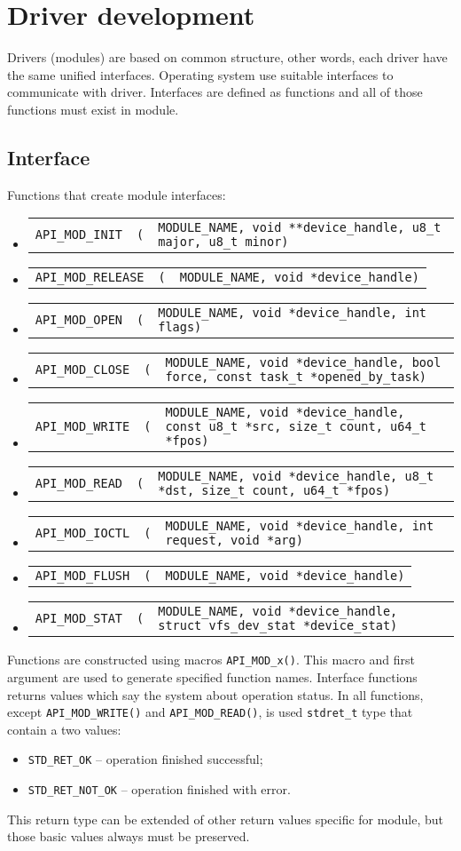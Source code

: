 \documentclass[a4paper,11pt]{report}
\makeatletter
\newcommand{\code}[1]{\texttt{#1}}
\newcommand{\type}[1]{\texttt{#1}}
\newcommand{\prototype}[2]{
   \begin{tabularx}{\textwidth}{@{}l@{}l@{}X}
      \code{#1} & \code{(} & \code{#2)}
   \end{tabularx}
}
\makeatother
\begin{document}
\chapter{Driver development}\label{sec:drv_devel}
Drivers (modules) are based on common structure, other words, each driver have the same
unified interfaces. Operating system use suitable interfaces to communicate with driver.
Interfaces are defined as functions and all of those functions must exist in module.

\section{Interface}
Functions that create module interfaces:
\begin{itemize}
   \item\prototype{API\_MOD\_INIT}{MODULE\_NAME, void **device\_handle, u8\_t major, u8\_t minor}
   \item\prototype{API\_MOD\_RELEASE}{MODULE\_NAME, void *device\_handle}
   \item\prototype{API\_MOD\_OPEN}{MODULE\_NAME, void *device\_handle, int flags}
   \item\prototype{API\_MOD\_CLOSE}{MODULE\_NAME, void *device\_handle, bool force, const task\_t *opened\_by\_task}
   \item\prototype{API\_MOD\_WRITE}{MODULE\_NAME, void *device\_handle, const u8\_t *src, size\_t count, u64\_t *fpos}
   \item\prototype{API\_MOD\_READ}{MODULE\_NAME, void *device\_handle, u8\_t *dst, size\_t count, u64\_t *fpos}
   \item\prototype{API\_MOD\_IOCTL}{MODULE\_NAME, void *device\_handle, int request, void *arg}
   \item\prototype{API\_MOD\_FLUSH}{MODULE\_NAME, void *device\_handle}
   \item\prototype{API\_MOD\_STAT}{MODULE\_NAME, void *device\_handle, struct vfs\_dev\_stat *device\_stat}
\end{itemize}

Functions are constructed using macros \code{API\_MOD\_x()}. This macro and first argument are used to
generate specified function names. Interface functions returns values which say the system about
operation status. In all functions, except \code{API\_MOD\_WRITE()} and \code{API\_MOD\_READ()}, is
used \type{stdret\_t} type that contain a two values:
\begin{itemize}
   \item \code{STD\_RET\_OK} -- operation finished successful;
   \item \code{STD\_RET\_NOT\_OK} -- operation finished with error.
\end{itemize}
This return type can be extended of other return values specific for module, but those basic values
always must be preserved.
\end{document}
